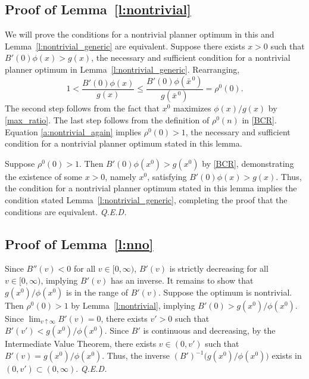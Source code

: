 \documentclass[12pt]{article}
\renewcommand{\qed}{{\it Q.E.D.}}
\newcommand{\efficacy}{\phi}
\newcommand{\general}{g}
\newcommand{\benefit}{B}
\newcommand{\ratio}{\rho^0\!}
\newcommand{\xno}{x^{0}}
\newcommand{\xnobar}{\bar{x}^{\,0}}
\begin{document}

\subsection*{Proof of Lemma~\ref{l:nontrivial}}

We will prove the conditions for a nontrivial planner optimum in this
and Lemma~\ref{l:nontrivial_generic} are equivalent. Suppose there
exists $x > 0$ such that $B'(0) \efficacy(x) > \general(x)$, the
necessary and sufficient condition for a nontrivial planner optimum in
Lemma~\ref{l:nontrivial_generic}. Rearranging,
\begin{equation}
\label{a:nontrivial_again}
1 < \frac{\benefit'(0) \efficacy(x)}{\general(x)} \leq
\frac{\benefit'(0) \efficacy(\xnobar)}{\general(\xnobar)} = \ratio(0).
\end{equation}
The second step follows from the fact that $\xno$ maximizes
$\efficacy(x) / \general(x)$ by \eqref{max_ratio}. The last step
follows from the definition of $\ratio(n)$ in \eqref{BCR}. Equation
\eqref{a:nontrivial_again} implies $\ratio(0) > 1$, the necessary and
sufficient condition for a nontrivial planner optimum stated in this
lemma.

Suppose $\ratio(0) > 1$. Then $\benefit'(0) \efficacy(\xno) >
\general(\xno)$ by \eqref{BCR}, demonstrating the existence of some $x
> 0$, namely $\xno$, satisfying $B'(0) \efficacy(x) >
\general(x)$. Thus, the condition for a nontrivial planner optimum
stated in this lemma implies the condition stated
Lemma~\ref{l:nontrivial_generic}, completing the proof that the
conditions are equivalent. \qed


\subsection*{Proof of Lemma~\ref{l:nno}}

Since $\benefit''(v) < 0$ for all $v \in [0, \infty)$, $\benefit'(v)$
  is strictly decreasing for all $v \in [0, \infty)$, implying
    $\benefit'(v)$ has an inverse. It remains to show that
    $\general(\xno) / \efficacy(\xno)$ is in the range of
    $\benefit'(v)$. Suppose the optimum is nontrivial. Then $\ratio(0)
    > 1$ by Lemma~\ref{l:nontrivial}, implying $\benefit'(0) >
    \general(\xno) / \efficacy(\xno)$. Since $\lim_{v \uparrow \infty}
    \benefit'(v) = 0$, there exists $v' > 0$ such that $\benefit'(v')
    < \general(\xno) / \efficacy(\xno)$. Since $\benefit'$ is
    continuous and decreasing, by the Intermediate Value Theorem,
    there exists $v \in (0, v')$ such that $\benefit'(v) =
    \general(\xno) / \efficacy(\xno)$. Thus, the inverse
    $(\benefit')^{-1} \bigl( \general(\xno) / \efficacy(\xno) \bigr)$
    exists in $(0,v') \subset (0, \infty)$. \qed
\end{document}
